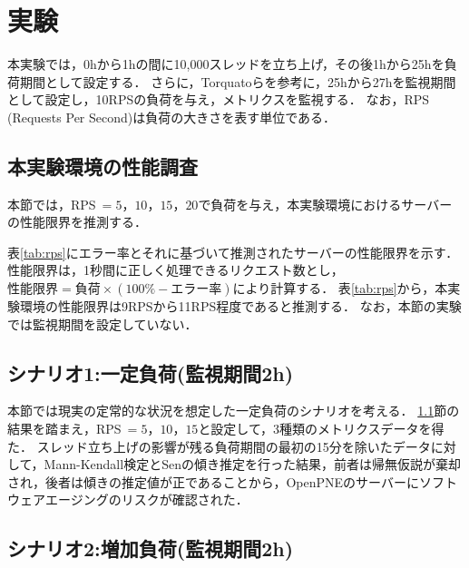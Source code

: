 \documentclass[twoside,twocolumn,10pt]{jarticle}  %
\begin{document}
\section{実験}
本実験では，0hから1hの間に10,000スレッドを立ち上げ，その後1hから25hを負荷期間として設定する．
さらに，Torquatoら\cite{Torquato2018SWAREa}を参考に，25hから27hを監視期間として設定し，10RPSの負荷を与え，メトリクスを監視する．
なお，RPS (Requests Per Second)は負荷の大きさを表す単位である．

\subsection{本実験環境の性能調査}
\label{subsec:limit}
本節では，RPS$~=5，10，15，20$で負荷を与え，本実験環境におけるサーバーの性能限界を推測する．

表\ref{tab:rps}にエラー率とそれに基づいて推測されたサーバーの性能限界を示す．
性能限界は，1秒間に正しく処理できるリクエスト数とし，$性能限界=負荷\times(100\%-エラー率)$により計算する．
表\ref{tab:rps}から，本実験環境の性能限界は9RPSから11RPS程度であると推測する．
なお，本節の実験では監視期間を設定していない．

\subsection{シナリオ1:一定負荷(監視期間2h)}\label{subsec:load1}

本節では現実の定常的な状況を想定した一定負荷のシナリオを考える．
\ref{subsec:limit}節の結果を踏まえ，RPS$~=5，10，15$と設定して，3種類のメトリクスデータを得た．
スレッド立ち上げの影響が残る負荷期間の最初の15分を除いたデータに対して，Mann-Kendall検定\cite{Mann1945Nonparametric}とSenの傾き推定\cite{Sen1968Estimates}を行った結果，前者は帰無仮説が棄却され，後者は傾きの推定値が正であることから，OpenPNEのサーバーにソフトウェアエージングのリスクが確認された．

\subsection{シナリオ2:増加負荷(監視期間2h)}\label{subsec:load2}
\end{document}

